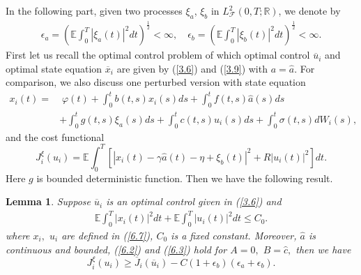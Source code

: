 \documentclass[11pt]{article}
\newtheorem{lemma}{Lemma}[section]
\def\dbE{\mathbb{E}}
\def\dbR{\mathbb{R}}
\begin{document}
 In the following part, given two processes $\xi _{a}$, $\xi _{b}$ in $L^2_{\mathcal{F}}(0,T;\dbR)$, we denote by
\begin{eqnarray}\label{6.6}
\epsilon _{a}=\left( \dbE\int_{0}^{T}|\xi _{a}(t)|^{2}dt\right)^{\frac{1}{2}}<\infty , \quad
\epsilon _{b}=\left( \dbE\int_{0}^{T}|\xi _{b}(t)|^{2}dt\right)^{\frac{1}{2}}<\infty .
\end{eqnarray}
%
First let us recall the optimal control problem of which optimal control $%
\overline{u}_{i}$ and optimal state equation $\overline{x}_{i}$ are
given by (\ref{3.6}) and (\ref{3.9}) with $a=\widehat{a}.$ For
comparison, we also discuss one perturbed version with state
equation
%
\begin{align}
x_{i}(t) = & \;\varphi (t)+\int_{0}^{t}b(t,s)x_{i}(s)ds+\int_{0}^{t}f(t,s)%
\widehat{a}(s)ds \nonumber \\
&+\int_{0}^{t}g(t,s)\xi
_{a}(s)ds+\int_{0}^{t}c(t,s)u_{i}(s)ds+\int_{0}^{t}\sigma
(t,s)dW_{i}(s), \label{6.7}
\end{align}
%
and the cost functional
\[
J_{i}^{\xi }(u_{i})=\dbE\int_{0}^{T}\left[ |x_{i}(t)-\gamma
\widehat{a}(t)-\eta +\xi _{b}(t)|^{2}+R|u_{i}(t)|^{2}\right]dt.
\]%
Here $g$ is bounded deterministic function. Then we have the
following result.
\begin{lemma}\label{lemma6.2}
Suppose $\overline{u}_{i}$ is an optimal control given in
(\ref{3.6}) and
\begin{eqnarray}\label{6.8}
\dbE\int_{0}^{T}|x_{i}(t)|^{2}dt+\dbE\int_{0}^{T}|u_{i}(t)|^{2}dt\leq
C_{0}.
\end{eqnarray}
%
where $ x_{i},$ $u_{i}$ are defined in (\ref{6.7}), $C_{0}$ is a
fixed constant. Moreover, $\widehat{a}$ is continuous and bounded,
(\ref{6.2}) and (\ref{6.3}) hold for $A=0,$ $B=\widehat{c},$ then we
have
%
\[
J_{i}^{\xi }(u_{i})\geq
\overline{J}_{i}(\overline{u}_{i})-C(1+\epsilon_b)(\epsilon_a+\epsilon_b).
\]
\end{lemma}
\end{document}

